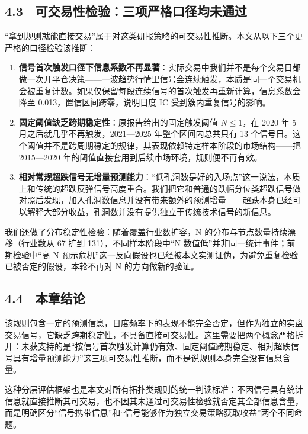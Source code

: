\documentclass[12pt,a4paper]{ctexart}
\begin{document}
\subsection{4.3　可交易性检验：三项严格口径均未通过}
“拿到规则就能直接交易”属于对这类研报策略的可交易性推断。本文从以下三个更严格的口径检验该推断：\par
\begin{enumerate}
\item \textbf{信号首次触发口径下信息系数不再显著}：实际交易中我们并不是每个交易日都做一次开平仓决策——一波趋势行情里信号会连续触发，本质是同一个交易机会被重复计数。如果仅保留每段连续信号的首次触发再重新计算，信息系数会降至 0.013，置信区间跨零，说明日度 IC 受到簇内重复信号的影响。
\item \textbf{固定阈值缺乏跨期稳定性}：原报告给出的固定触发阈值 \(N \le 1\)，在 2020 年 5 月之后就几乎不再触发，2021—2025 年整个区间内总共只有 13 个信号日。这个阈值并不是跨周期稳定的规律，其表现依赖特定样本阶段的市场结构——把 2015—2020 年的阈值直接套用到后续市场环境，规则便不再有效。
\item \textbf{相对常规超跌信号无增量预测能力}：“低孔洞数是好的入场点”这一说法，本质上和传统的超跌反弹信号高度重合。我们把它和普通的跌幅分位类超跌信号做对照后发现，加入孔洞数信息并没有带来额外的预测增量——超跌本身已经可以解释大部分收益，孔洞数并没有提供独立于传统技术信号的新信息。
\end{enumerate}
我们还做了分布稳定性检验：随着覆盖行业数扩容，N 的分布与节点数量持续漂移（行业数从 67 扩到 131），不同样本阶段中“N 数值低”并非同一统计事件；前期检验中“高 N 预示危机”这一反向假设也已经被本文实测证伪，为避免重复检验已被否定的假设，本轮不再对 N 的方向做新的验证。\par

\subsection{4.4　本章结论}
该规则包含一定的预测信息，日度频率下的表现不能完全否定，但作为独立的实盘交易信号，它缺乏跨期稳定性，不具备直接可交易性。这里需要把两个概念严格拆开：未获支持的是“按信号首次触发计算仍有效、固定阈值跨期稳定、相对超跌信号具有增量预测能力”这三项可交易性推断，而不是说规则本身完全没有信息含量。\par

这种分层评估框架也是本文对所有拓扑类规则的统一判读标准：不因信号具有统计信息就直接推断其可交易，也不因其未通过可交易性检验就否定其全部信息含量，而是明确区分“信号携带信息”和“信号能够作为独立交易策略获取收益”两个不同命题。\par
\end{document}
